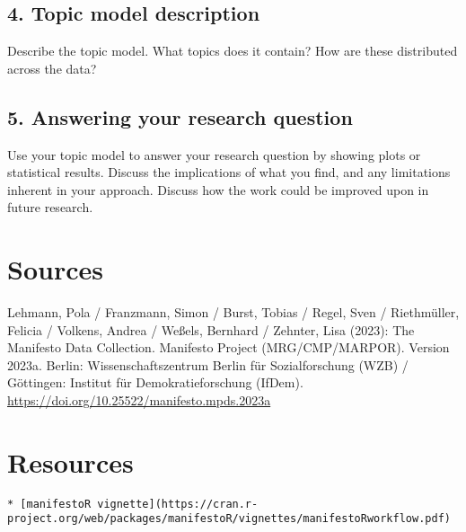 \documentclass[
]{article}
\begin{document}
\hypertarget{topic-model-description}{%
\subsection{4. Topic model description}\label{topic-model-description}}

Describe the topic model. What topics does it contain? How are these
distributed across the data?

\hypertarget{answering-your-research-question}{%
\subsection{5. Answering your research
question}\label{answering-your-research-question}}

Use your topic model to answer your research question by showing plots
or statistical results. Discuss the implications of what you find, and
any limitations inherent in your approach. Discuss how the work could be
improved upon in future research.

\hypertarget{sources}{%
\section{Sources}\label{sources}}

Lehmann, Pola / Franzmann, Simon / Burst, Tobias / Regel, Sven /
Riethmüller, Felicia / Volkens, Andrea / Weßels, Bernhard / Zehnter,
Lisa (2023): The Manifesto Data Collection. Manifesto Project
(MRG/CMP/MARPOR). Version 2023a. Berlin: Wissenschaftszentrum Berlin für
Sozialforschung (WZB) / Göttingen: Institut für Demokratieforschung
(IfDem). \url{https://doi.org/10.25522/manifesto.mpds.2023a}

\hypertarget{resources}{%
\section{Resources}\label{resources}}

\begin{verbatim}
* [manifestoR vignette](https://cran.r-project.org/web/packages/manifestoR/vignettes/manifestoRworkflow.pdf)
\end{verbatim}

  
\end{document}
